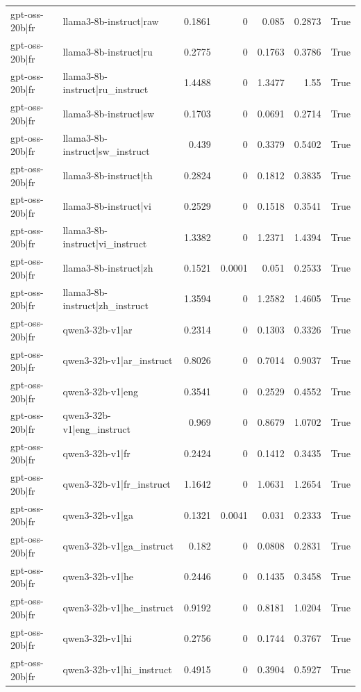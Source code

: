 \begin{table}
\begin{tabular}{l l r r r r l}
gpt-oss-20b|fr & llama3-8b-instruct|raw & 0.1861 & 0 & 0.085 & 0.2873 & True \\
gpt-oss-20b|fr & llama3-8b-instruct|ru & 0.2775 & 0 & 0.1763 & 0.3786 & True \\
gpt-oss-20b|fr & llama3-8b-instruct|ru_instruct & 1.4488 & 0 & 1.3477 & 1.55 & True \\
gpt-oss-20b|fr & llama3-8b-instruct|sw & 0.1703 & 0 & 0.0691 & 0.2714 & True \\
gpt-oss-20b|fr & llama3-8b-instruct|sw_instruct & 0.439 & 0 & 0.3379 & 0.5402 & True \\
gpt-oss-20b|fr & llama3-8b-instruct|th & 0.2824 & 0 & 0.1812 & 0.3835 & True \\
gpt-oss-20b|fr & llama3-8b-instruct|vi & 0.2529 & 0 & 0.1518 & 0.3541 & True \\
gpt-oss-20b|fr & llama3-8b-instruct|vi_instruct & 1.3382 & 0 & 1.2371 & 1.4394 & True \\
gpt-oss-20b|fr & llama3-8b-instruct|zh & 0.1521 & 0.0001 & 0.051 & 0.2533 & True \\
gpt-oss-20b|fr & llama3-8b-instruct|zh_instruct & 1.3594 & 0 & 1.2582 & 1.4605 & True \\
gpt-oss-20b|fr & qwen3-32b-v1|ar & 0.2314 & 0 & 0.1303 & 0.3326 & True \\
gpt-oss-20b|fr & qwen3-32b-v1|ar_instruct & 0.8026 & 0 & 0.7014 & 0.9037 & True \\
gpt-oss-20b|fr & qwen3-32b-v1|eng & 0.3541 & 0 & 0.2529 & 0.4552 & True \\
gpt-oss-20b|fr & qwen3-32b-v1|eng_instruct & 0.969 & 0 & 0.8679 & 1.0702 & True \\
gpt-oss-20b|fr & qwen3-32b-v1|fr & 0.2424 & 0 & 0.1412 & 0.3435 & True \\
gpt-oss-20b|fr & qwen3-32b-v1|fr_instruct & 1.1642 & 0 & 1.0631 & 1.2654 & True \\
gpt-oss-20b|fr & qwen3-32b-v1|ga & 0.1321 & 0.0041 & 0.031 & 0.2333 & True \\
gpt-oss-20b|fr & qwen3-32b-v1|ga_instruct & 0.182 & 0 & 0.0808 & 0.2831 & True \\
gpt-oss-20b|fr & qwen3-32b-v1|he & 0.2446 & 0 & 0.1435 & 0.3458 & True \\
gpt-oss-20b|fr & qwen3-32b-v1|he_instruct & 0.9192 & 0 & 0.8181 & 1.0204 & True \\
gpt-oss-20b|fr & qwen3-32b-v1|hi & 0.2756 & 0 & 0.1744 & 0.3767 & True \\
gpt-oss-20b|fr & qwen3-32b-v1|hi_instruct & 0.4915 & 0 & 0.3904 & 0.5927 & True \\

\end{tabular}
\end{table}
